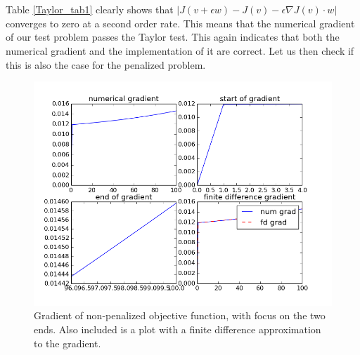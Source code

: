 \\
\\
Table \ref{Taylor_tab1} clearly shows that $|J(v+\epsilon w)-J(v)-\epsilon \nabla J(v)\cdot w|$ converges to zero at a second order rate. This means that the numerical gradient of our test problem passes the Taylor test. This again indicates that both the numerical gradient and the implementation of it are correct. Let us then check if this is also the case for the penalized problem.
\begin{figure}[h]
\caption{Gradient of non-penalized objective function, with focus on the two ends. Also included is a plot with a finite difference approximation to the gradient.}
\centering
\includegraphics[scale=0.5]{num_grad.png}
\end{figure}
